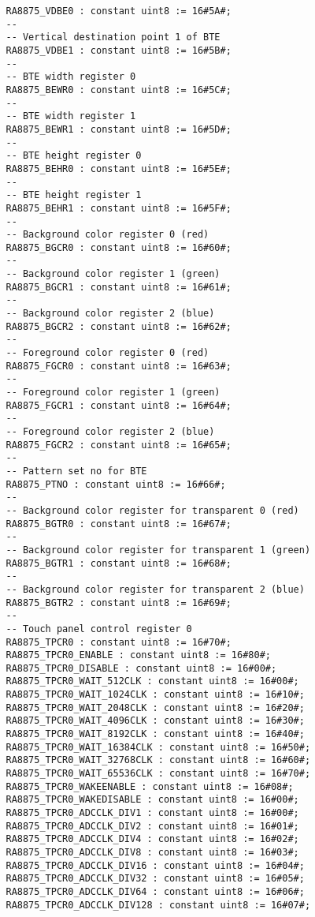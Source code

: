 \documentclass[10pt, openany]{book}
\begin{document}
\begin{lstlisting}
   RA8875_VDBE0 : constant uint8 := 16#5A#;
   --
   -- Vertical destination point 1 of BTE
   RA8875_VDBE1 : constant uint8 := 16#5B#;
   --
   -- BTE width register 0
   RA8875_BEWR0 : constant uint8 := 16#5C#;
   --
   -- BTE width register 1
   RA8875_BEWR1 : constant uint8 := 16#5D#;
   --
   -- BTE height register 0
   RA8875_BEHR0 : constant uint8 := 16#5E#;
   --
   -- BTE height register 1
   RA8875_BEHR1 : constant uint8 := 16#5F#;
   --
   -- Background color register 0 (red)
   RA8875_BGCR0 : constant uint8 := 16#60#;
   --
   -- Background color register 1 (green)
   RA8875_BGCR1 : constant uint8 := 16#61#;
   --
   -- Background color register 2 (blue)
   RA8875_BGCR2 : constant uint8 := 16#62#;
   --
   -- Foreground color register 0 (red)
   RA8875_FGCR0 : constant uint8 := 16#63#;
   --
   -- Foreground color register 1 (green)
   RA8875_FGCR1 : constant uint8 := 16#64#;
   --
   -- Foreground color register 2 (blue)
   RA8875_FGCR2 : constant uint8 := 16#65#;
   --
   -- Pattern set no for BTE
   RA8875_PTNO : constant uint8 := 16#66#;
   --
   -- Background color register for transparent 0 (red)
   RA8875_BGTR0 : constant uint8 := 16#67#;
   --
   -- Background color register for transparent 1 (green)
   RA8875_BGTR1 : constant uint8 := 16#68#;
   --
   -- Background color register for transparent 2 (blue)
   RA8875_BGTR2 : constant uint8 := 16#69#;
   --
   -- Touch panel control register 0
   RA8875_TPCR0 : constant uint8 := 16#70#;
   RA8875_TPCR0_ENABLE : constant uint8 := 16#80#;
   RA8875_TPCR0_DISABLE : constant uint8 := 16#00#;
   RA8875_TPCR0_WAIT_512CLK : constant uint8 := 16#00#;
   RA8875_TPCR0_WAIT_1024CLK : constant uint8 := 16#10#;
   RA8875_TPCR0_WAIT_2048CLK : constant uint8 := 16#20#;
   RA8875_TPCR0_WAIT_4096CLK : constant uint8 := 16#30#;
   RA8875_TPCR0_WAIT_8192CLK : constant uint8 := 16#40#;
   RA8875_TPCR0_WAIT_16384CLK : constant uint8 := 16#50#;
   RA8875_TPCR0_WAIT_32768CLK : constant uint8 := 16#60#;
   RA8875_TPCR0_WAIT_65536CLK : constant uint8 := 16#70#;
   RA8875_TPCR0_WAKEENABLE : constant uint8 := 16#08#;
   RA8875_TPCR0_WAKEDISABLE : constant uint8 := 16#00#;
   RA8875_TPCR0_ADCCLK_DIV1 : constant uint8 := 16#00#;
   RA8875_TPCR0_ADCCLK_DIV2 : constant uint8 := 16#01#;
   RA8875_TPCR0_ADCCLK_DIV4 : constant uint8 := 16#02#;
   RA8875_TPCR0_ADCCLK_DIV8 : constant uint8 := 16#03#;
   RA8875_TPCR0_ADCCLK_DIV16 : constant uint8 := 16#04#;
   RA8875_TPCR0_ADCCLK_DIV32 : constant uint8 := 16#05#;
   RA8875_TPCR0_ADCCLK_DIV64 : constant uint8 := 16#06#;
   RA8875_TPCR0_ADCCLK_DIV128 : constant uint8 := 16#07#;

\end{lstlisting}
\end{document}
